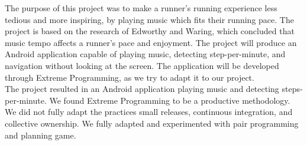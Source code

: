The purpose of this project was to make a runner's running experience less tedious and more inspiring, by playing music which fits their running pace. 
The project is based on the research of Edworthy and Waring, which concluded that music tempo affects a runner's pace and enjoyment.
The project will produce an Android application capable of playing music, detecting step-per-minute, and navigation without looking at the screen.
The application will be developed through Extreme Programming, as we try to adapt it to our project.\\
The project resulted in an Android application playing music and detecting steps-per-minute.
We found Extreme Programming to be a productive methodology.
We did not fully adapt the practices small releases, continuous integration, and collective ownership.
We fully adapted and experimented with pair programming and planning game.